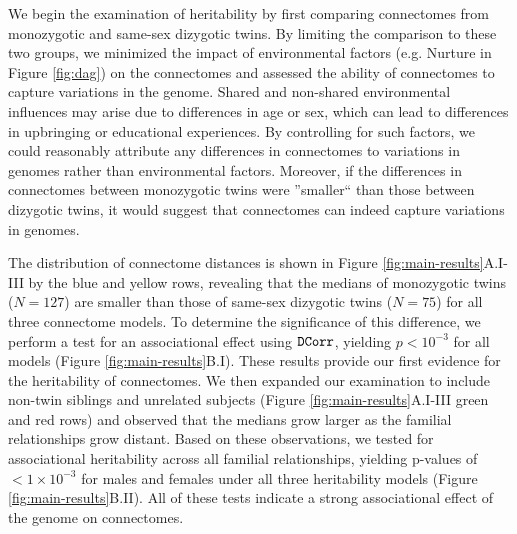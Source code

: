We begin the examination of heritability by first comparing connectomes from monozygotic and same-sex dizygotic twins. By limiting the comparison to these two groups, we minimized the impact of environmental factors (e.g. Nurture in Figure \ref{fig:dag}) on the connectomes and assessed the ability of connectomes to capture variations in the genome. Shared and non-shared environmental influences may arise due to differences in age or sex, which can lead to differences in upbringing or educational experiences. By controlling for such factors, we could reasonably attribute any differences in connectomes to variations in genomes rather than environmental factors. Moreover, if the differences in connectomes between monozygotic twins were ''smaller`` than those between dizygotic twins, it would suggest that connectomes can indeed capture variations in genomes. 

The distribution of connectome distances is shown in Figure \ref{fig:main-results}A.I-III by the blue and yellow rows, revealing that the medians of monozygotic twins ($N=127$) are smaller than those of same-sex dizygotic twins ($N=75$) for all three connectome models. To determine the significance of this difference, we perform a test for an associational effect using $\operatorname{\mathtt{DCorr}}$, yielding $p <10^{-3}$ for all models (Figure \ref{fig:main-results}B.I). These results provide our first evidence for the heritability of connectomes. We then expanded our examination to include non-twin siblings and unrelated subjects (Figure \ref{fig:main-results}A.I-III green and red rows) and observed that the medians grow larger as the familial relationships grow distant. Based on these observations, we tested for associational heritability across all familial relationships, yielding p-values of $<1\times 10^{-3}$ for males and females under all three heritability models (Figure \ref{fig:main-results}B.II). All of these tests indicate a strong associational effect of the genome on connectomes.

